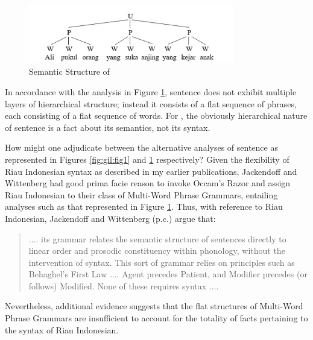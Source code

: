 \documentclass[output=paper,colorlinks,citecolor=brown
]{langscibook}
\begin{document}
\begin{figure}
\centering
\includegraphics[width=0.8\textwidth]{gil_figure3.png}
\caption{\label{fig:gil:fig3}Semantic Structure of }
\end{figure}

In accordance with the analysis in Figure \ref{fig:gil:fig3}, sentence  does not exhibit multiple layers of hierarchical structure; instead it consists of a flat sequence of phrases, each consisting of a flat sequence of words.  For \citet{jackendoff2014syntax,jackendoff2017linear}, the obviously hierarchical nature of sentence  is a fact about its semantics, not its syntax.

How might one adjudicate between the alternative analyses of sentence  as represented in Figures \ref{fig:gil:fig1} and \ref{fig:gil:fig3} respectively?  Given the flexibility of Riau Indonesian syntax as described in my earlier publications, Jackendoff and Wittenberg had good prima facie reason to invoke Occam's Razor and assign Riau Indonesian to their class of Multi-Word Phrase Grammars, entailing analyses such as that represented in Figure \ref{fig:gil:fig3}.  Thus, with reference to Riau Indonesian, Jackendoff and Wittenberg (p.c.) argue that:

\begin{quote}
    .... its grammar relates the semantic structure of sentences directly to linear order and prosodic constituency within phonology, without the intervention of syntax.  This sort of grammar relies on principles such as Behaghel’s First Law .... Agent precedes Patient, and Modifier precedes (or follows) Modified.  None of these requires syntax ....
\end{quote}
Nevertheless, additional evidence suggests that the flat structures of Multi-Word Phrase Grammars are insufficient to account for the totality of facts pertaining to the syntax of Riau Indonesian.
\end{document}
